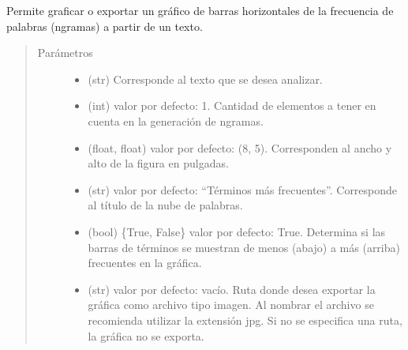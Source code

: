 \documentclass[letterpaper,10pt,openany,spanish]{sphinxmanual}
\begin{document}
\begin{fulllineitems}
\label{\detokenize{funciones/exploracion:exploracion.grafica_barchart_frecuencias}}
Permite graficar o exportar un gráfico de barras horizontales de la frecuencia de palabras (n\sphinxhyphen{}gramas) a partir de un texto.
\begin{quote}\begin{description}
\item[{Parámetros}] \leavevmode\begin{itemize}
\item {} 
 \textendash{} (str) Corresponde al texto que se desea analizar.

\item {} 
 \textendash{} (int) valor por defecto: 1. Cantidad de elementos a tener en cuenta en la generación de n\sphinxhyphen{}gramas.

\item {} 
 \textendash{} (float, float) valor por defecto: (8, 5). Corresponden al ancho y alto de la figura en pulgadas.

\item {} 
 \textendash{} (str) valor por defecto: “Términos más frecuentes”. Corresponde al título de la nube de palabras.

\item {} 
 \textendash{} (bool) \{True, False\} valor por defecto: True. Determina si las barras de términos se muestran de menos (abajo) a más (arriba) frecuentes en la gráfica.

\item {} 
 \textendash{} (str) valor por defecto: vacío. Ruta donde desea exportar la gráfica como archivo tipo imagen. Al nombrar el archivo se recomienda utilizar la extensión jpg. Si no se especifica una ruta, la gráfica no se exporta.


\end{itemize}
\end{description}
\end{quote}
\end{fulllineitems}
\end{document}
